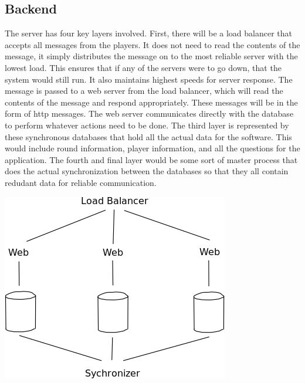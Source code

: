 \documentclass{dependencies/acm_proc_article-sp}
\begin{document}
\subsection{Backend}
The server has four key layers involved.
First, there will be a load balancer that accepts all messages from the players.
It does not need to read the contents of the message, it simply distributes the message on to the most reliable server with the lowest load.
This ensures that if any of the servers were to go down, that the system would still run.
It also maintains highest speeds for server response.
The message is passed to a web server from the load balancer, which will read the contents of the message and respond appropriately.
These messages will be in the form of http messages.
The web server communicates directly with the database to perform whatever actions need to be done.
The third layer is represented by these synchronous databases that hold all the actual data for the software.
This would include round information, player information, and all the questions for the application.
The fourth and final layer would be some sort of master process that does the
actual synchronization between the databases so that they all contain redudant data for reliable communication.

\begin{center}
  \includegraphics[scale=0.3]{design-pictures/database.png}
\end{center}

\newpage
%
%
%
\balancecolumns
\end{document}
